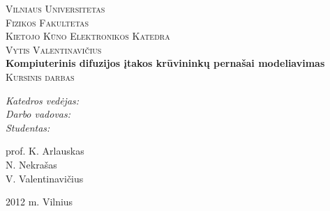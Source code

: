 \begin{titlepage}

\begin{center}



\textsc{\LARGE Vilniaus Universitetas} \\
\textsc{\LARGE Fizikos Fakultetas} \\
\textsc{\LARGE Kietojo Kūno Elektronikos Katedra}\\[2cm]

\textsc{\Large Vytis Valentinavičius}\\[1.5cm]




{ \huge \bfseries Kompiuterinis difuzijos įtakos krūvininkų pernašai modeliavimas}\\[1cm]

\textsc{\Large Kursinis darbas}\\[2cm]

\begin{minipage}{0.4\textwidth}
\begin{flushleft} \large
\emph{Katedros vedėjas:} \\
\emph{Darbo vadovas:} \\
\emph{Studentas:} \\
\end{flushleft}
\end{minipage}
\begin{minipage}{0.4\textwidth}
\begin{flushright} \large
prof. K. Arlauskas \\
N. Nekrašas \\
V. Valentinavičius \\
\end{flushright}
\end{minipage}



\vfill

{\large 2012 m. Vilnius}

\end{center}

\end{titlepage}